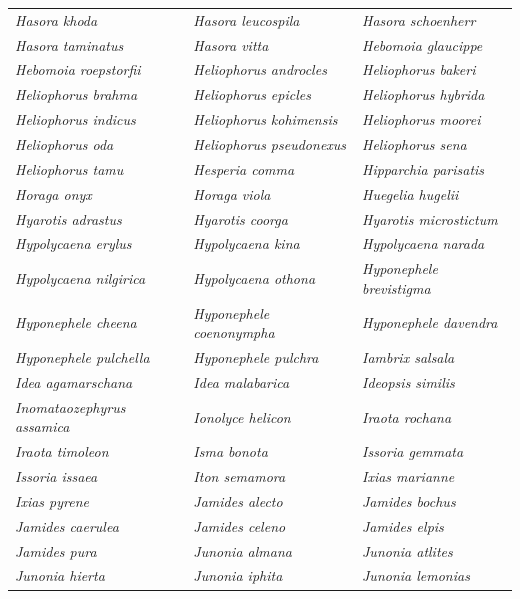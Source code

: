 \documentclass[runningheads]{llncs}
\begin{document}
\begin{longtable}{lll}
\textit{Hasora khoda} & \textit{Hasora leucospila} & \textit{Hasora schoenherr} \\
\textit{Hasora taminatus} & \textit{Hasora vitta} & \textit{Hebomoia glaucippe} \\
\textit{Hebomoia roepstorfii} & \textit{Heliophorus androcles} & \textit{Heliophorus bakeri} \\
\textit{Heliophorus brahma} & \textit{Heliophorus epicles} & \textit{Heliophorus hybrida} \\
\textit{Heliophorus indicus} & \textit{Heliophorus kohimensis} & \textit{Heliophorus moorei} \\
\textit{Heliophorus oda} & \textit{Heliophorus pseudonexus} & \textit{Heliophorus sena} \\
\textit{Heliophorus tamu} & \textit{Hesperia comma} & \textit{Hipparchia parisatis} \\
\textit{Horaga onyx} & \textit{Horaga viola} & \textit{Huegelia hugelii} \\
\textit{Hyarotis adrastus} & \textit{Hyarotis coorga} & \textit{Hyarotis microstictum} \\
\textit{Hypolycaena erylus} & \textit{Hypolycaena kina} & \textit{Hypolycaena narada} \\
\textit{Hypolycaena nilgirica} & \textit{Hypolycaena othona} & \textit{Hyponephele brevistigma} \\
\textit{Hyponephele cheena} & \textit{Hyponephele coenonympha} & \textit{Hyponephele davendra} \\
\textit{Hyponephele pulchella} & \textit{Hyponephele pulchra} & \textit{Iambrix salsala} \\
\textit{Idea agamarschana} & \textit{Idea malabarica} & \textit{Ideopsis similis} \\
\textit{Inomataozephyrus assamica} & \textit{Ionolyce helicon} & \textit{Iraota rochana} \\
\textit{Iraota timoleon} & \textit{Isma bonota} & \textit{Issoria gemmata} \\
\textit{Issoria issaea} & \textit{Iton semamora} & \textit{Ixias marianne} \\
\textit{Ixias pyrene} & \textit{Jamides alecto} & \textit{Jamides bochus} \\
\textit{Jamides caerulea} & \textit{Jamides celeno} & \textit{Jamides elpis} \\
\textit{Jamides pura} & \textit{Junonia almana} & \textit{Junonia atlites} \\
\textit{Junonia hierta} & \textit{Junonia iphita} & \textit{Junonia lemonias} \\

\end{longtable}
\end{document}
